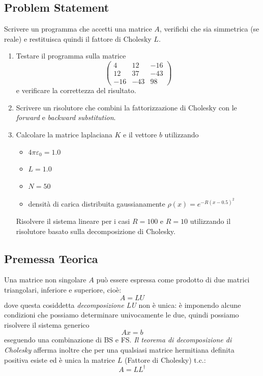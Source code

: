 \subsection{Problem Statement}
Scrivere un programma che accetti una matrice $A$, verifichi che sia simmetrica (se reale) e restituisca quindi il fattore di Cholesky $L$.

\begin{enumerate}
    \item Testare il programma sulla matrice
    \[
    \begin{pmatrix}
    4 & 12 & -16 \\
    12 & 37 & -43 \\
    -16 & -43 & 98
    \end{pmatrix}
    \]
    e verificare la correttezza del risultato.
    
    \item Scrivere un risolutore che combini la fattorizzazione di Cholesky con le \textit{forward} e \textit{backward substitution}.
    
    \item Calcolare la matrice laplaciana $K$ e il vettore $b$ utilizzando
    \begin{itemize}
        \item $4\pi\varepsilon_0 = 1.0$
        \item $L = 1.0$
        \item $N = 50$
        \item densità di carica distribuita gaussianamente $\rho(x) = e^{-R(x-0.5)^2}$
    \end{itemize}
    
    Risolvere il sistema lineare per i casi $R = 100$ e $R = 10$ utilizzando il risolutore basato sulla decomposizione di Cholesky.
\end{enumerate}


\subsection{Premessa Teorica} \label{Cap: Cholesky}
Una matrice non singolare $A$ può essere espressa come prodotto di due matrici triangolari, inferiore e superiore, cioè:
\[
A = LU
\]
dove questa cosiddetta \textit{decomposizione LU} non è unica: è imponendo alcune condizioni che possiamo determinare univocamente le due, quindi possiamo risolvere il sistema generico 
\[
Ax = b
\]
eseguendo una combinazione di BS e FS. \textit{Il teorema di decomposizione di Cholesky} afferma inoltre che per una qualsiasi matrice hermitiana definita positiva esiste ed è unica la matrice $L$ (Fattore di Cholesky) t.c.:
\[
A = LL^\dagger
\]

